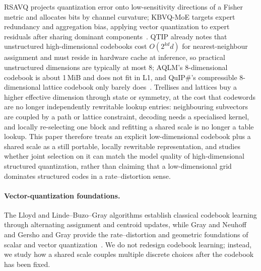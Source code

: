 RSAVQ projects quantization error onto low-sensitivity directions of a Fisher metric and allocates bits by channel curvature; KBVQ-MoE targets expert redundancy and aggregation bias, applying vector quantization to expert residuals after sharing dominant components~\cite{rsavq,kbvqmoe}.
QTIP already notes that unstructured high-dimensional codebooks cost $O(2^{kd}d)$ for nearest-neighbour assignment and must reside in hardware cache at inference, so practical unstructured dimensions are typically at most 8; AQLM's 8-dimensional codebook is about 1\,MiB and does not fit in L1, and QuIP\#'s compressible 8-dimensional lattice codebook only barely does~\cite{qtip,aqlm,quipsharp}.
Trellises and lattices buy a higher effective dimension through state or symmetry, at the cost that codewords are no longer independently rewritable lookup entries: neighbouring subvectors are coupled by a path or lattice constraint, decoding needs a specialised kernel, and locally re-selecting one block and refitting a shared scale is no longer a table lookup.
This paper therefore treats an explicit low-dimensional codebook plus a shared scale as a still portable, locally rewritable representation, and studies whether joint selection on it can match the model quality of high-dimensional structured quantization, rather than claiming that a low-dimensional grid dominates structured codes in a rate--distortion sense.

\paragraph{Vector-quantization foundations.}
The Lloyd and Linde--Buzo--Gray algorithms establish classical codebook learning through alternating assignment and centroid updates, while Gray and Neuhoff and Gersho and Gray provide the rate--distortion and geometric foundations of scalar and vector quantization~\cite{lloyd,lbg,grayneuhoff,gershogray}.
We do not redesign codebook learning; instead, we study how a shared scale couples multiple discrete choices after the codebook has been fixed.

